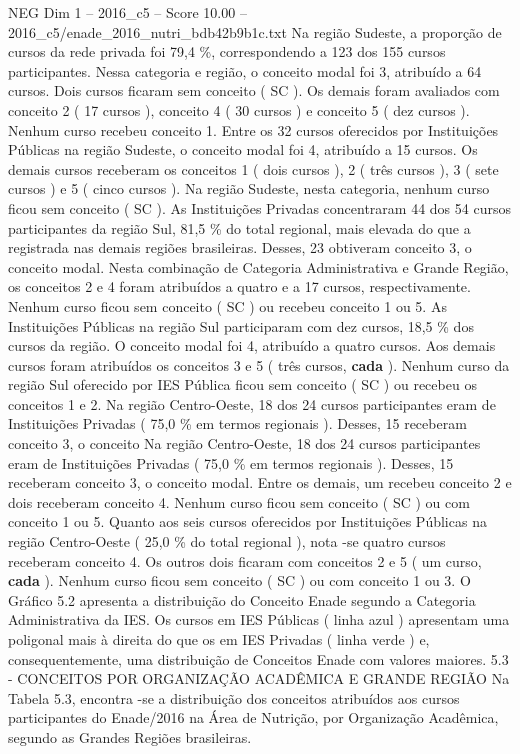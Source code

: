 \begin{textsample}{NEG Dim 1 – 2016\_c5 – Score 10.00 – 2016\_c5/enade\_2016\_nutri\_bdb42b9b1c.txt}
Na região Sudeste, a proporção de cursos da rede privada foi 79,4 \%, correspondendo a 123 dos 155 cursos participantes.
Nessa categoria e região, o conceito modal foi 3, atribuído a 64 cursos.
Dois cursos ficaram sem conceito ( SC ).
Os demais foram avaliados com conceito 2 ( 17 cursos ), conceito 4 ( 30 cursos ) e conceito 5 ( dez cursos ).
Nenhum curso recebeu conceito 1.
Entre os 32 cursos oferecidos por Instituições Públicas na região Sudeste, o conceito modal foi 4, atribuído a 15 cursos.
Os demais cursos receberam os conceitos 1 ( dois cursos ), 2 ( três cursos ), 3 ( sete cursos ) e 5 ( cinco cursos ).
Na região Sudeste, nesta categoria, nenhum curso ficou sem conceito ( SC ).
As Instituições Privadas concentraram 44 dos 54 cursos participantes da região Sul, 81,5 \% do total regional, mais elevada do que a registrada nas demais regiões brasileiras.
Desses, 23 obtiveram conceito 3, o conceito modal.
Nesta combinação de Categoria Administrativa e Grande Região, os conceitos 2 e 4 foram atribuídos a quatro e a 17 cursos, respectivamente.
Nenhum curso ficou sem conceito ( SC ) ou recebeu conceito 1 ou 5.
As Instituições Públicas na região Sul participaram com dez cursos, 18,5 \% dos cursos da região.
O conceito modal foi 4, atribuído a quatro cursos.
Aos demais cursos foram atribuídos os conceitos 3 e 5 ( três cursos, \textbf{cada} ).
Nenhum curso da região Sul oferecido por IES Pública ficou sem conceito ( SC ) ou recebeu os conceitos 1 e 2.
Na região Centro-Oeste, 18 dos 24 cursos participantes eram de Instituições Privadas ( 75,0 \% em termos regionais ).
Desses, 15 receberam conceito 3, o conceito Na região Centro-Oeste, 18 dos 24 cursos participantes eram de Instituições Privadas ( 75,0 \% em termos regionais ).
Desses, 15 receberam conceito 3, o conceito modal.
Entre os demais, um recebeu conceito 2 e dois receberam conceito 4.
Nenhum curso ficou sem conceito ( SC ) ou com conceito 1 ou 5.
Quanto aos seis cursos oferecidos por Instituições Públicas na região Centro-Oeste ( 25,0 \% do total regional ), nota -se quatro cursos receberam conceito 4.
Os outros dois ficaram com conceitos 2 e 5 ( um curso, \textbf{cada} ).
Nenhum curso ficou sem conceito ( SC ) ou com conceito 1 ou 3.
O Gráfico 5.2 apresenta a distribuição do Conceito Enade segundo a Categoria Administrativa da IES.
Os cursos em IES Públicas ( linha azul ) apresentam uma poligonal mais à direita do que os em IES Privadas ( linha verde ) e, consequentemente, uma distribuição de Conceitos Enade com valores maiores. 5.3 - CONCEITOS POR ORGANIZAÇÃO ACADÊMICA E GRANDE REGIÃO Na Tabela 5.3, encontra -se a distribuição dos conceitos atribuídos aos cursos participantes do Enade/2016 na Área de Nutrição, por Organização Acadêmica, segundo as Grandes Regiões brasileiras.

\end{textsample}
